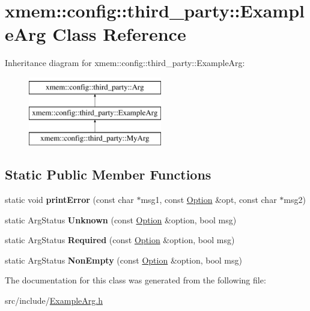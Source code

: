 \hypertarget{classxmem_1_1config_1_1third__party_1_1_example_arg}{}\section{xmem\+:\+:config\+:\+:third\+\_\+party\+:\+:Example\+Arg Class Reference}
\label{classxmem_1_1config_1_1third__party_1_1_example_arg}
Inheritance diagram for xmem\+:\+:config\+:\+:third\+\_\+party\+:\+:Example\+Arg\+:\begin{figure}[H]
\begin{center}
\leavevmode
\includegraphics[height=3.000000cm]{classxmem_1_1config_1_1third__party_1_1_example_arg}
\end{center}
\end{figure}
\subsection*{Static Public Member Functions}
\begin{DoxyCompactItemize}
\item 
\hypertarget{classxmem_1_1config_1_1third__party_1_1_example_arg_a6121fd77d3727bb02ccd4438256beda0}{}static void {\bfseries print\+Error} (const char $\ast$msg1, const \hyperlink{classxmem_1_1config_1_1third__party_1_1_option}{Option} \&opt, const char $\ast$msg2)\label{classxmem_1_1config_1_1third__party_1_1_example_arg_a6121fd77d3727bb02ccd4438256beda0}

\item 
\hypertarget{classxmem_1_1config_1_1third__party_1_1_example_arg_a62f8121cadd8dfee722a1649caaa878c}{}static Arg\+Status {\bfseries Unknown} (const \hyperlink{classxmem_1_1config_1_1third__party_1_1_option}{Option} \&option, bool msg)\label{classxmem_1_1config_1_1third__party_1_1_example_arg_a62f8121cadd8dfee722a1649caaa878c}

\item 
\hypertarget{classxmem_1_1config_1_1third__party_1_1_example_arg_a9c71f36051376cdfbb807049a92921cf}{}static Arg\+Status {\bfseries Required} (const \hyperlink{classxmem_1_1config_1_1third__party_1_1_option}{Option} \&option, bool msg)\label{classxmem_1_1config_1_1third__party_1_1_example_arg_a9c71f36051376cdfbb807049a92921cf}

\item 
\hypertarget{classxmem_1_1config_1_1third__party_1_1_example_arg_ae641da2aeb27824f7a26b6859ba75dd3}{}static Arg\+Status {\bfseries Non\+Empty} (const \hyperlink{classxmem_1_1config_1_1third__party_1_1_option}{Option} \&option, bool msg)\label{classxmem_1_1config_1_1third__party_1_1_example_arg_ae641da2aeb27824f7a26b6859ba75dd3}

\end{DoxyCompactItemize}


The documentation for this class was generated from the following file\+:\begin{DoxyCompactItemize}
\item 
src/include/\hyperlink{_example_arg_8h}{Example\+Arg.\+h}\end{DoxyCompactItemize}
